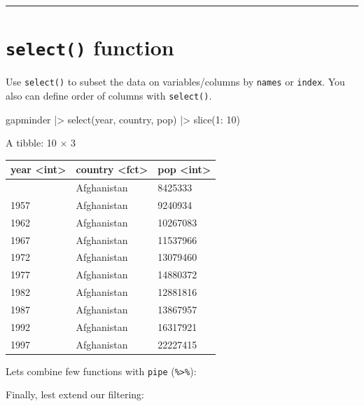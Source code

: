 \documentclass[
  letterpaper,
  DIV=11,
  numbers=noendperiod]{scrreprt}
\newenvironment{Shaded}{\begin{snugshade}}{\end{snugshade}}
\newcommand{\DecValTok}[1]{\textcolor[rgb]{0.68,0.00,0.00}{#1}}
\newcommand{\FunctionTok}[1]{\textcolor[rgb]{0.28,0.35,0.67}{#1}}
\newcommand{\NormalTok}[1]{\textcolor[rgb]{0.00,0.23,0.31}{#1}}
\newcommand{\SpecialCharTok}[1]{\textcolor[rgb]{0.37,0.37,0.37}{#1}}
\begin{document}
\begin{center}\rule{0.5\linewidth}{0.5pt}\end{center}

\section{\texorpdfstring{\texttt{select()}
function}{select() function}}\label{select-function}

Use \texttt{select()} to subset the data on variables/columns by
\texttt{names} or \texttt{index}. You also can define order of columns
with \texttt{select()}.

\begin{Shaded}
\begin{Highlighting}[]
\NormalTok{gapminder }\SpecialCharTok{|\textgreater{}} 
\FunctionTok{select}\NormalTok{(year, country, pop) }\SpecialCharTok{|\textgreater{}}
\FunctionTok{slice}\NormalTok{(}\DecValTok{1}\SpecialCharTok{:} \DecValTok{10}\NormalTok{)}
\end{Highlighting}
\end{Shaded}

A tibble: 10 × 3

\begin{longtable}[]{@{}lll@{}}
\toprule\noalign{}
year \textless int\textgreater{} & country \textless fct\textgreater{} &
pop \textless int\textgreater{} \\
\midrule\noalign{}
\endhead
\bottomrule\noalign{}
\endlastfoot
1952 & Afghanistan & 8425333 \\
1957 & Afghanistan & 9240934 \\
1962 & Afghanistan & 10267083 \\
1967 & Afghanistan & 11537966 \\
1972 & Afghanistan & 13079460 \\
1977 & Afghanistan & 14880372 \\
1982 & Afghanistan & 12881816 \\
1987 & Afghanistan & 13867957 \\
1992 & Afghanistan & 16317921 \\
1997 & Afghanistan & 22227415 \\
\end{longtable}

Lets combine few functions with \texttt{pipe}
(\texttt{\%\textgreater{}\%}):

Finally, lest extend our filtering:
\end{document}
